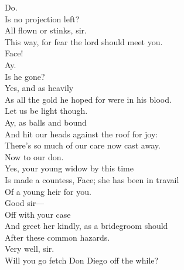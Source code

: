 \documentclass[a4paper,oneside,12pt]{memoir}
\begin{document}
\begin{drama*}
\mammonspeaks {} Do.\\
Is no projection left?\\
\facespeaks {} All flown or stinks, sir.\\
This way, for fear the lord should meet you.\\
\subtlespeaks {}  Face!\\
\facespeaks Ay.\\
\subtlespeaks {} Is he gone?\\
\facespeaks {} Yes, and as heavily\\
As all the gold he hoped for were in his blood.\\
Let us be light though.\\
\subtlespeaks {}  Ay, as balls and bound\\
And hit our heads against the roof for joy:\\
There's so much of our care now cast away.\\
\facespeaks Now to our don.\\
\subtlespeaks {} Yes, your young widow by this time\\
Is made a countess, Face; she has been in travail\\
Of a young heir for you.\\
\facespeaks {} Good sir---\\
\subtlespeaks {} Off with your case\\
And greet her kindly, as a bridegroom should\\
After these common hazards.\\
\facespeaks {} Very well, sir.\\
Will you go fetch Don Diego off the while?\\

\scene


\end{drama*}
\end{document}
